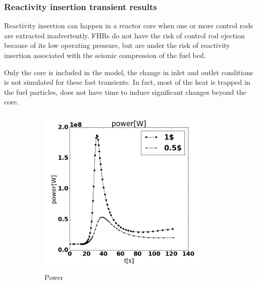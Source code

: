 \documentclass{elsarticle}
\begin{document}
\subsubsection{Reactivity insertion transient results}
Reactivity insertion can happen in a reactor core when one or more control rods are extracted inadvertently. FHRs do not have the risk of control rod ejection because of its low operating pressure, but are under the risk of reactivity insertion associated with the seismic compression of the fuel bed.

Only the core is included in the model, the change in inlet and outlet conditions is not simulated for these fast transients. In fact, most of the heat is trapped in the fuel particles, does not have time to induce significant changes beyond the core.

\begin{figure}[ht]
    \centering
    \begin{subfigure}[b]{0.45\columnwidth}
        \centering
        \includegraphics[width=0.9\textwidth]{./images/diffusion/RI/power_diff_pcm.png}
        \caption{Power}
    \end{subfigure}%
    ~
    \begin{subfigure}[b]{0.45\columnwidth}
        \centering

\end{subfigure}
\end{figure}
\end{document}
